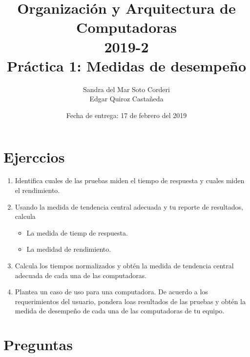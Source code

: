 \documentclass{article}
\begin{document}
    
    \title{Organización y Arquitectura de Computadoras\\
    \large 2019-2 \\
    \large Práctica 1: Medidas de desempeño}

    \date{Fecha de entrega: 17 de febrero del 2019}

    \author{Sandra del Mar Soto Corderi\\
    Edgar Quiroz Castañeda}

    \maketitle



    \section{Ejerccios}

    \begin{enumerate}
        \item {
            Identifica cuales de las pruebas miden el tiempo de respuesta y 
            cuales miden el rendimiento.
        }
        \item {
            Usando la medida de tendencia central adecuada y tu reporte de 
            resultados, calcula
            \begin{itemize}
                \item {
                    La medida de tiemp de respuesta.
                }
                \item {
                    La medidad de rendimiento.
                }
            \end{itemize}
            
        }
        \item {
            Calcula los tiempos normalizados y obtén la medida de tendencia 
            central adecuada de cada una de las computadoras.
        }
        \item {
            Plantea un caso de uso para una computadora. De acuerdo a los 
            requerimientos del usuario, pondera loas resultados de las pruebas 
            y obtén la medida de desempeño de cada una de las computadoras de tu
            equipo.
        }
    \end{enumerate}

    \section{Preguntas}
\end{document}
